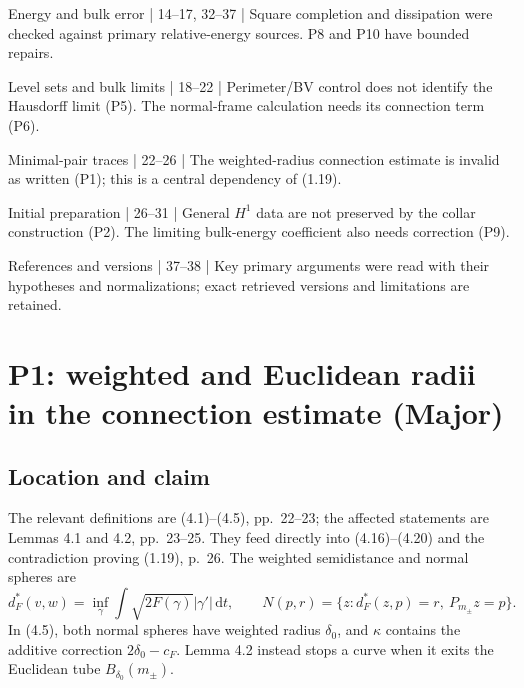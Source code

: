 \documentclass[10pt]{article}
\begin{document}
Energy and bulk error | 14–17, 32–37 | Square completion and dissipation were checked against primary relative-energy sources. P8 and P10 have bounded repairs.\par
Level sets and bulk limits | 18–22 | Perimeter/BV control does not identify the Hausdorff limit (P5). The normal-frame calculation needs its connection term (P6).\par
Minimal-pair traces | 22–26 | The weighted-radius connection estimate is invalid as written (P1); this is a central dependency of (1.19).\par
Initial preparation | 26–31 | General \(H^1\) data are not preserved by the collar construction (P2). The limiting bulk-energy coefficient also needs correction (P9).\par
References and versions | 37–38 | Key primary arguments were read with their hypotheses and normalizations; exact retrieved versions and limitations are retained.\par
\section*{P1: weighted and Euclidean radii in the connection estimate (Major)}
\subsection*{Location and claim}
The relevant definitions are (4.1)–(4.5), pp. 22–23; the affected statements are Lemmas 4.1 and 4.2, pp. 23–25. They feed directly into (4.16)–(4.20) and the contradiction proving (1.19), p. 26. The weighted semidistance and normal spheres are \[d_F^*(v,w)=\inf_\gamma\int\sqrt{2F(\gamma)}|\gamma'|\,\mathrm dt,\qquad
 N(p,r)=\{z:d_F^*(z,p)=r,\ P_{m_\pm}z=p\}.\] In (4.5), both normal spheres have weighted radius \(\delta_0\), and \(\kappa\) contains the additive correction \(2\delta_0-c_F\). Lemma 4.2 instead stops a curve when it exits the Euclidean tube \(B_{\delta_0}(m_\pm)\).\par
\end{document}
